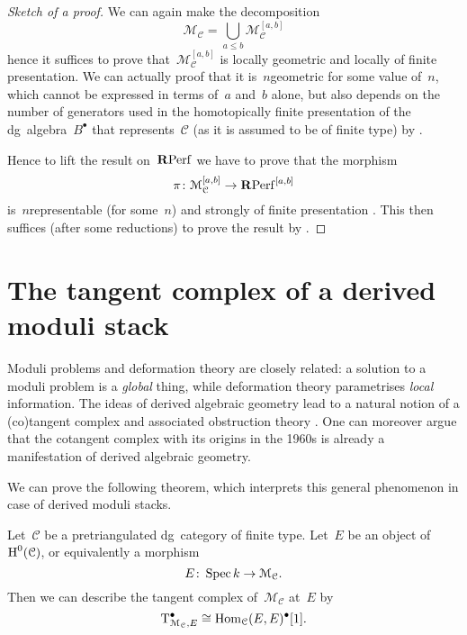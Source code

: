 \begin{refsection}
\begin{theorem}
  \begin{proof}[Sketch of a proof]
    We can again make the decomposition
    \begin{equation}
      \mathcal{M}_{\mathcal{C}}=\bigcup_{a\leq b}\mathcal{M}_{\mathcal{C}}^{[a,b]}
    \end{equation}
    hence it suffices to prove that~$\mathcal{M}_{\mathcal{C}}^{[a,b]}$ is locally geometric and locally of finite presentation. We can actually proof that it is~$n$\dash geometric for some value of~$n$, which cannot be expressed in terms of~$a$ and~$b$ alone, but also depends on the number of generators used in the homotopically finite presentation of the dg~algebra~$B^\bullet$ that represents~$\mathcal{C}$ (as it is assumed to be of finite type) by \cite[corollary 2.12]{toen-vaquie-moduli-of-objects-in-dg-categories}.

    Hence to lift the result on~$\mathbf{R}\mathrm{Perf}$ we have to prove that the morphism
    \begin{equation}
      \pi\colon\mathcal{M}_{\mathcal{C}}^{[a,b]}\to\mathbf{R}\mathrm{Perf}^{[a,b]}
    \end{equation}
    is~$n$\dash representable (for some~$n$) and strongly of finite presentation \cite[lemma 2.20]{toen-vaquie-moduli-of-objects-in-dg-categories}. This then suffices (after some reductions) to prove the result by \cite[lemma 2.15]{toen-vaquie-moduli-of-objects-in-dg-categories}.
  \end{proof}
\end{theorem}


\section{The tangent complex of a derived moduli stack}
Moduli problems and deformation theory are closely related: a solution to a moduli problem is a \emph{global} thing, while deformation theory parametrises \emph{local} information. The ideas of derived algebraic geometry lead to a natural notion of a (co)tangent complex and associated obstruction theory \cite[section 2.2]{toen-vezzosi-hag-II}. One can moreover argue that the cotangent complex with its origins in the 1960s is already a manifestation of derived algebraic geometry.

We can prove the following theorem, which interprets this general phenomenon \cite[section 1.4]{toen-vezzosi-hag-II} in case of derived moduli stacks.
\begin{theorem}
  Let~$\mathcal{C}$ be a pretriangulated dg~category of finite type. Let~$E$ be an object of~$\operatorname{H}^0(\mathcal{C})$, or equivalently a morphism
  \begin{equation}
    E\colon\operatorname{Spec} k\to\mathcal{M}_{\mathcal{C}}.
  \end{equation}
  Then we can describe the tangent complex of~$\mathcal{M}_{\mathcal{C}}$ at~$E$ by
  \begin{equation}
    \mathrm{T}_{\mathcal{M}_{\mathcal{C}},E}^\bullet\cong\mathrm{Hom}_{\mathcal{C}}(E,E)^\bullet[1].
  \end{equation}
\end{theorem}


\end{refsection}
